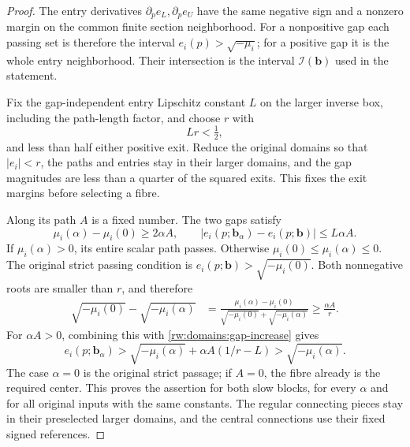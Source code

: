 \begin{proof}
The entry derivatives $\partial_p e_L,\partial_p e_U$ have the
same negative sign and a nonzero margin on the common finite section
neighborhood. For a nonpositive gap each passing set is therefore
the interval $e_i(p)>\sqrt{-\mu_i}$; for a positive gap it is the
whole entry neighborhood. Their intersection is the interval
$\mathcal I(\mathbf b)$ used in the statement.

Fix the gap-independent entry Lipschitz constant $L$ on the larger
inverse box, including the path-length factor, and choose $r$ with
\[
 Lr<\tfrac12,
\]
and less than half either positive exit. Reduce the original domains
so that $|e_i|<r$, the paths and entries stay in their larger domains,
and the gap magnitudes are less than a quarter of the squared exits.
This fixes the exit margins before selecting a fibre.

Along its path $A$ is a fixed number. The two gaps satisfy
\begin{equation}\label{rw:domains:gap-increase}
 \mu_i(\alpha)-\mu_i(0)\ge2\alpha A,\qquad
 |e_i(p;\mathbf b_\alpha)-e_i(p;\mathbf b)|\le L\alpha A.
\end{equation}
If $\mu_i(\alpha)>0$, its entire scalar path passes. Otherwise
$\mu_i(0)\le\mu_i(\alpha)\le0$. The original strict passing
condition is
$e_i(p;\mathbf b)>\sqrt{-\mu_i(0)}$. Both nonnegative roots
are smaller than $r$, and therefore
\begin{align*}
 \sqrt{-\mu_i(0)}-\sqrt{-\mu_i(\alpha)}
 &=\frac{\mu_i(\alpha)-\mu_i(0)}
         {\sqrt{-\mu_i(0)}+\sqrt{-\mu_i(\alpha)}}
 \ge\frac{\alpha A}{r}.
\end{align*}
For $\alpha A>0$, combining this with
\eqref{rw:domains:gap-increase} gives
\[
 e_i(p;\mathbf b_\alpha)>
 \sqrt{-\mu_i(\alpha)}+\alpha A(1/r-L)
 >\sqrt{-\mu_i(\alpha)}.
\]
The case $\alpha=0$ is the original strict passage; if $A=0$, the
fibre already is the required center. This proves the assertion for
both slow blocks, for every $\alpha$ and for all original inputs
with the same constants. The regular connecting pieces stay in their
preselected larger domains, and the central connections use their
fixed signed references.


\end{proof}

